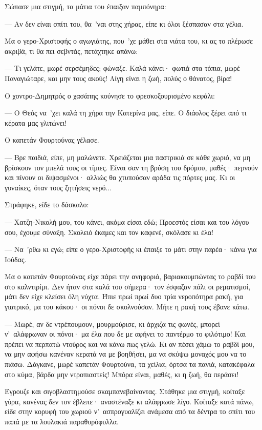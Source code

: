 \documentclass[diploma]{softlab-thesis}
\begin{document}
Σώπασε μια στιγμή, τα μάτια του έπαιξαν παμπόνηρα:

--- Αν δεν είναι σπίτι του, θα~’ναι στης χήρας, είπε κι όλοι ξέσπασαν στα
γέλια.

Μα ο γερο-Χριστοφής ο αγωγιάτης, που~’χε μάθει στα νιάτα του, κι ας το
πλέρωσε ακριβά, τι θα πει σεβντάς, πετάχτηκε απάνω:

--- Τι γελάτε, μωρέ σερσέμηδες; φώναξε. Καλά κάνει· φωτιά στα τόπια, μωρέ
Παναγιώταρε, και μην τους ακούς! Λίγη είναι η ζωή, πολύς ο θάνατος, βίρα!

Ο χοντρο-Δημητρός ο χασάπης κούνησε το φρεσκοξουρισμένο κεφάλι:

--- Ο Θεός να~’χει καλά τη χήρα την Κατερίνα μας, είπε. Ο διάολος ξέρει από
τι κέρατα μας γλιτώνει!

Ο καπετάν Φουρτούνας γέλασε.

--- Βρε παιδιά, είπε, μη μαλώνετε. Χρειάζεται μια παστρικιά σε κάθε χωριό,
να μη βρίσκουν τον μπελά τους οι τίμιες. Είναι σαν τη βρύση του δρόμου,
μαθές· περνούν και πίνουν οι διψασμένοι· αλλιώς θα χτυπούσαν αράδα τις
πόρτες μας. Κι οι γυναίκες, όταν τους ζητήσεις νερό...

Στράφηκε, είδε το δάσκαλο:

--- Χατζη-Νικολή μου, του κάνει, ακόμα είσαι εδώ; Προεστός είσαι και του
λόγου σου, έχουμε σύναξη. Σκολειό έκαμες και τον καφενέ, σκόλασε κι έλα!

--- Να~’ρθω κι εγώ; είπε ο γερο-Χριστοφής κι έπαιξε το μάτι στην παρέα· κάνω
για Ιούδας.

Μα ο καπετάν Φουρτούνας είχε πάρει την ανηφοριά, βαριακουμπώντας το ραβδί
του στο καλντιρίμι. Δεν ήταν στα καλά του σήμερα· τον έσφαζαν πάλι οι
ρεματισμοί, μάτι δεν είχε κλείσει όλη νύχτα. Ήπιε πρωί πρωί δυο τρία
νεροπότηρα ρακή, για γιατρικό, μα του κάκου· οι πόνοι δε σκολνούσαν. Μήτε η
ρακή τους έβανε κάτω.

--- Μωρέ, αν δε ντρέπουμουν, μουρμούρισε, κι άρχιζα τις φωνές, μπορεί
ν’~αλάφρωναν οι πόνοι· μα έλα που δε με αφήνει το παντέρμο το φιλότιμο! Και
πρέπει να περπατώ ντούρος και να κάνω πως γελώ. Κι αν πέσει χάμω το ραβδί
μου, να μην αφήσω κανέναν κερατά να με βοηθήσει, μα να σκύψω μοναχός μου να
το πιάσω. Δάγκανε, μωρέ καπετάν Φουρτούνα, τα χείλια, όρτσα τα πανιά,
κατακέφαλα στο κύμα, βάρδα μην ντροπιαστείς! Μπόρα είναι, μαθές, κι η ζωή,
θα περάσει!

Έγρουζε και σιγοβλαστημούσε σκαμπανεβαίνοντας. Στάθηκε μια στιγμή, κοίταξε
γύρα, κανένας δεν τον έβλεπε· αναστέναξε κι αλάφρωσε λίγο. Κοίταξε κατά
πάνω, είδε στην κορυφή του χωριού ν’~ασπρογυαλίζει ανάμεσα από τα δέντρα το
σπίτι του παπά με τα λουλακιά παραθυρόφυλλα.
\end{document}

